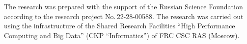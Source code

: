 




\Ack
\noindent
The research was prepared with the support of the Russian Science Foundation according to the 
research project No.\,22-28-00588. The research was carried out using the infrastructure of the 
Shared Research Facilities ``High Performance Computing and Big Data'' (CKP ``Informatics'') 
of FRC CSC RAS (Moscow).





